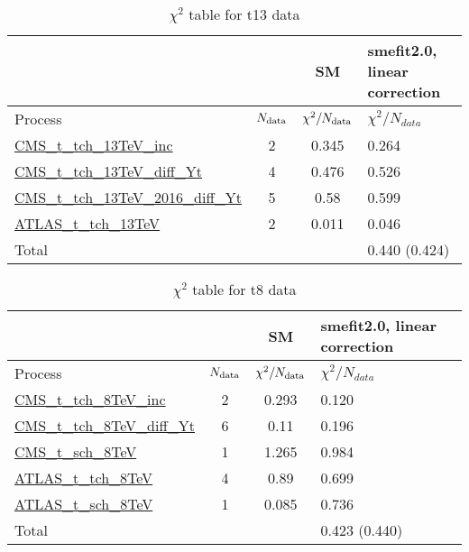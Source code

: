 \documentclass{article}
\begin{document}
\begin{table}[H]
\centering
\begin{tabular}{|l|c|c|C{3cm}|}
\hline
  & SM& smefit2.0, linear correction\\ \hline
Process & $N_{\rm data}$ & $\chi^ 2/N_{\rm data}$& $\chi^ 2/N_{data}$\\ \hline
\href{https://arxiv.org/abs/1610.00678}{CMS_t_tch_13TeV_inc} & 2 & 0.345 & {\color{black} 0.264} \\ \hline
\href{https://cds.cern.ch/record/2151074}{CMS_t_tch_13TeV_diff_Yt} & 4 & 0.476 & {\color{black} 0.526} \\ \hline
\href{https://arxiv.org/abs/1907.08330}{CMS_t_tch_13TeV_2016_diff_Yt} & 5 & 0.58 & {\color{black} 0.599} \\ \hline
\href{https://arxiv.org/abs/1609.03920}{ATLAS_t_tch_13TeV} & 2 & 0.011 & {\color{black} 0.046} \\ \hline
\hline Total & &  & 0.440 (0.424) \\ \hline
\end{tabular}
\caption{$\chi^2$ table for t13 data}
\end{table}
\begin{table}[H]
\centering
\begin{tabular}{|l|c|c|C{3cm}|}
\hline
  & SM& smefit2.0, linear correction\\ \hline
Process & $N_{\rm data}$ & $\chi^ 2/N_{\rm data}$& $\chi^ 2/N_{data}$\\ \hline
\href{https://arxiv.org/abs/1403.7366}{CMS_t_tch_8TeV_inc} & 2 & 0.293 & {\color{blue} 0.120} \\ \hline
\href{https://cds.cern.ch/record/1956681}{CMS_t_tch_8TeV_diff_Yt} & 6 & 0.11 & {\color{black} 0.196} \\ \hline
\href{https://arxiv.org/abs/1603.02555}{CMS_t_sch_8TeV} & 1 & 1.265 & {\color{black} 0.984} \\ \hline
\href{https://arxiv.org/abs/1702.02859}{ATLAS_t_tch_8TeV} & 4 & 0.89 & {\color{black} 0.699} \\ \hline
\href{https://arxiv.org/abs/1511.05980}{ATLAS_t_sch_8TeV} & 1 & 0.085 & {\color{black} 0.736} \\ \hline
\hline Total & &  & 0.423 (0.440) \\ \hline
\end{tabular}
\caption{$\chi^2$ table for t8 data}
\end{table}
\end{document}

